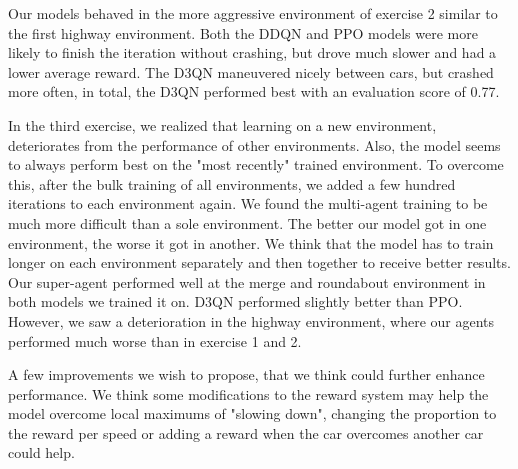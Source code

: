\documentclass[leqno]{article}
\begin{document}
\begin{multicols}{2}
Our models behaved in the more aggressive environment of exercise 2 similar to the first highway environment. Both the DDQN and PPO models were more likely to finish the iteration without crashing, but drove much slower and had a lower average reward. The D3QN maneuvered nicely between cars, but crashed more often, in total, the D3QN performed best with an evaluation score of 0.77.

In the third exercise, we realized that learning on a new environment, deteriorates from the performance of other environments. Also, the model seems to always perform best on the "most recently" trained environment. To overcome this, after the bulk training of all environments, we added a few hundred iterations to each environment again. We found the multi-agent training to be much more difficult than a sole environment. The better our model got in one environment, the worse it got in another. We think that the model has to train longer on each environment separately and then together to receive better results. Our super-agent performed well at the merge and roundabout environment in both models we trained it on. D3QN performed slightly better than PPO. However, we saw a deterioration in the highway environment, where our agents performed much worse than in exercise 1 and 2.

A few improvements we wish to propose, that we think could further enhance performance. We think some modifications to the reward system may help the model overcome local maximums of "slowing down", changing the proportion to the reward per speed or adding a reward when the car overcomes another car could help.


\printbibliography

\end{multicols}
\end{document}
